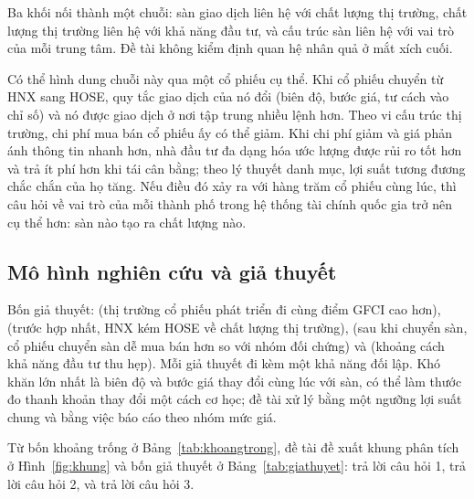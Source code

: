Ba khối nối thành một chuỗi: sàn giao dịch liên hệ với chất lượng thị trường, chất lượng thị trường liên hệ với khả năng đầu tư, và cấu trúc sàn liên hệ với vai trò của mỗi trung tâm. Đề tài không kiểm định quan hệ nhân quả ở mắt xích cuối.

Có thể hình dung chuỗi này qua một cổ phiếu cụ thể. Khi cổ phiếu chuyển từ HNX sang HOSE, quy tắc giao dịch của nó đổi (biên độ, bước giá, tư cách vào chỉ số) và nó được giao dịch ở nơi tập trung nhiều lệnh hơn. Theo vi cấu trúc thị trường, chi phí mua bán cổ phiếu ấy có thể giảm. Khi chi phí giảm và giá phản ánh thông tin nhanh hơn, nhà đầu tư đa dạng hóa ước lượng được rủi ro tốt hơn và trả ít phí hơn khi tái cân bằng; theo lý thuyết danh mục, lợi suất tương đương chắc chắn của họ tăng. Nếu điều đó xảy ra với hàng trăm cổ phiếu cùng lúc, thì câu hỏi về vai trò của mỗi thành phố trong hệ thống tài chính quốc gia trở nên cụ thể hơn: sàn nào tạo ra chất lượng nào.

\subsection{Mô hình nghiên cứu và giả thuyết}\label{sec:giathuyet}

\begin{tomtat}
Bốn giả thuyết:  (thị trường cổ phiếu phát triển đi cùng điểm GFCI cao hơn),  (trước hợp nhất, HNX kém HOSE về chất lượng thị trường),  (sau khi chuyển sàn, cổ phiếu chuyển sàn dễ mua bán hơn so với nhóm đối chứng) và  (khoảng cách khả năng đầu tư thu hẹp). Mỗi giả thuyết đi kèm một khả năng đối lập. Khó khăn lớn nhất là biên độ và bước giá thay đổi cùng lúc với sàn, có thể làm thước đo thanh khoản thay đổi một cách cơ học; đề tài xử lý bằng một ngưỡng lợi suất chung và bằng việc báo cáo theo nhóm mức giá.
\end{tomtat}

Từ bốn khoảng trống ở Bảng~\ref{tab:khoangtrong}, đề tài đề xuất khung phân tích ở Hình~\ref{fig:khung} và bốn giả thuyết ở Bảng~\ref{tab:giathuyet}:  trả lời câu hỏi 1,  trả lời câu hỏi 2,  và  trả lời câu hỏi 3.

